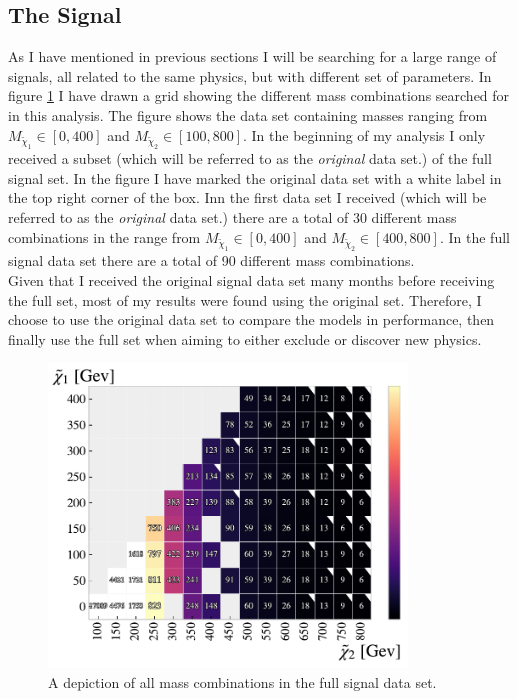\subsection{The Signal}\label{subsec:signal}
As I have mentioned in previous sections I will be searching for a large range of signals, all related to the same
physics, but with different set of parameters. In figure \ref{fig:nrSignal} I have drawn a grid showing the different mass combinations 
searched for in this analysis. The figure shows the data set containing masses ranging from $M_{\tilde{\chi}_1}\in[0,400]$
and $M_{\tilde{\chi}_2}\in[100,800]$. In the beginning of my analysis I only received a subset (which will be referred to as the 
\emph{original} data set.) of the full signal set. In the figure I have marked the original data set with a white label in the top 
right corner of the box. Inn the first data set I received (which will be referred to as the \emph{original} data set.) there are a 
total of 30 different mass combinations in the range from $M_{\tilde{\chi}_1}\in[0,400]$ and $M_{\tilde{\chi}_2}\in[400,800]$. In the 
full signal data set there are a total of 90 different mass combinations.
\\
Given that I received the original signal data set many months before receiving the full set, most of my results were found using the 
original set. Therefore, I choose to use the original data set to compare the models in performance, then finally use the full set 
when aiming to either exclude or discover new physics.
\begin{figure}
  \centering
  \includegraphics[width=0.85\textwidth]{Figures/MLResults/NN/SUSY/Grid/NrSignalEvents.pdf}
  \caption{A depiction of all mass combinations in the full signal data set.}
  \label{fig:nrSignal}
\end{figure}

